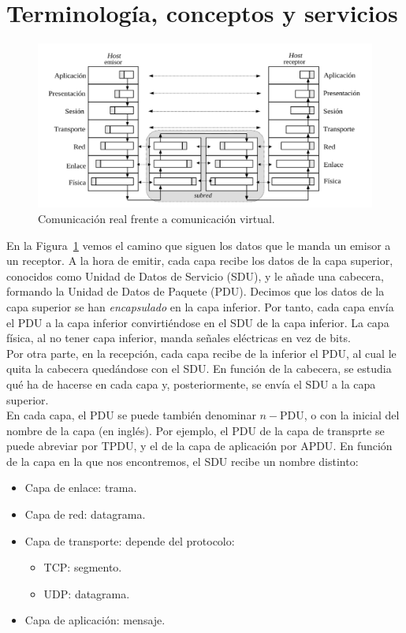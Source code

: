 \section{Terminología, conceptos y servicios} \label{sec:terminologia}

\begin{figure}
    \centering
    \includegraphics[width=0.8\linewidth]{./images/comunicacionHosts.png}
    \caption{Comunicación real frente a comunicación virtual.}
    \label{fig:comHosts}
\end{figure}

En la Figura~\ref{fig:comHosts} vemos el camino que siguen los datos que le manda un emisor a un receptor. A la hora de emitir, cada capa recibe los datos de la capa superior, conocidos como Unidad de Datos de Servicio (\acrfull{SDU}), y le añade una cabecera, formando la Unidad de Datos de Paquete (\acrfull{PDU}). Decimos que los datos de la capa superior se han \emph{encapsulado} en la capa inferior. Por tanto, cada capa envía el \acrshort{PDU} a la capa inferior convirtiéndose en el \acrshort{SDU} de la capa inferior. La capa física, al no tener capa inferior, manda señales eléctricas en vez de bits. \\

Por otra parte, en la recepción, cada capa recibe de la inferior el \acrshort{PDU}, al cual le quita la cabecera quedándose con el \acrshort{SDU}. En función de la cabecera, se estudia qué ha de hacerse en cada capa y, posteriormente, se envía el \acrshort{SDU} a la capa superior.\\

En cada capa, el \acrshort{PDU} se puede también denominar $n-$\acrshort{PDU}, o con la inicial del nombre de la capa (en inglés). Por ejemplo, el \acrshort{PDU} de la capa de transprte se puede abreviar por \acrshort{TPDU}, y el de la capa de aplicación por \acrshort{APDU}.
En función de la capa en la que nos encontremos, el \acrshort{SDU} recibe un nombre distinto:
\begin{itemize}
    \item Capa de enlace: trama.
    \item Capa de red: datagrama.
    \item Capa de transporte: depende del protocolo:
        \begin{itemize}
            \item \acrshort{TCP}: segmento.
            \item \acrshort{UDP}: datagrama.
        \end{itemize}
    \item Capa de aplicación: mensaje.
\end{itemize}

